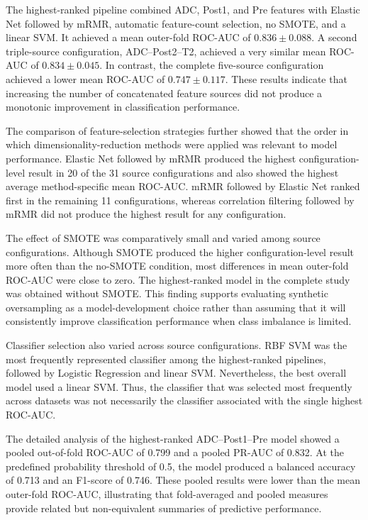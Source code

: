 \documentclass[12pt,twocolumn]{article}
\begin{document}
The highest-ranked pipeline combined ADC, Post1, and Pre features with
Elastic Net followed by mRMR, automatic feature-count selection, no
SMOTE, and a linear SVM. It achieved a mean outer-fold ROC-AUC of
\(0.836 \pm 0.088\). A second triple-source configuration,
ADC--Post2--T2, achieved a very similar mean ROC-AUC of
\(0.834 \pm 0.045\). In contrast, the complete five-source
configuration achieved a lower mean ROC-AUC of
\(0.747 \pm 0.117\). These results indicate that increasing the number
of concatenated feature sources did not produce a monotonic
improvement in classification performance.

The comparison of feature-selection strategies further showed that
the order in which dimensionality-reduction methods were applied was
relevant to model performance. Elastic Net followed by mRMR produced
the highest configuration-level result in 20 of the 31 source
configurations and also showed the highest average method-specific
mean ROC-AUC. mRMR followed by Elastic Net ranked first in the
remaining 11 configurations, whereas correlation filtering followed
by mRMR did not produce the highest result for any configuration.

The effect of SMOTE was comparatively small and varied among source
configurations. Although SMOTE produced the higher configuration-level
result more often than the no-SMOTE condition, most differences in
mean outer-fold ROC-AUC were close to zero. The highest-ranked model
in the complete study was obtained without SMOTE. This finding
supports evaluating synthetic oversampling as a model-development
choice rather than assuming that it will consistently improve
classification performance when class imbalance is limited.

Classifier selection also varied across source configurations. RBF
SVM was the most frequently represented classifier among the
highest-ranked pipelines, followed by Logistic Regression and linear
SVM. Nevertheless, the best overall model used a linear SVM. Thus,
the classifier that was selected most frequently across datasets was
not necessarily the classifier associated with the single highest
ROC-AUC.

The detailed analysis of the highest-ranked ADC--Post1--Pre model
showed a pooled out-of-fold ROC-AUC of 0.799 and a pooled PR-AUC of
0.832. At the predefined probability threshold of 0.5, the model
produced a balanced accuracy of 0.713 and an F1-score of 0.746.
These pooled results were lower than the mean outer-fold ROC-AUC,
illustrating that fold-averaged and pooled measures provide related
but non-equivalent summaries of predictive performance.
\end{document}
